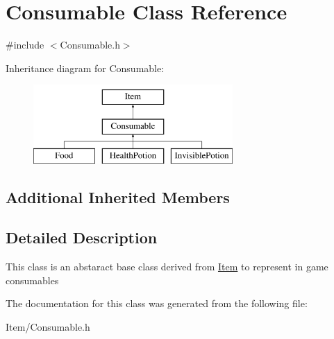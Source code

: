 \hypertarget{classConsumable}{\section{Consumable Class Reference}
\label{classConsumable}
}


{\ttfamily \#include $<$Consumable.\-h$>$}

Inheritance diagram for Consumable\-:\begin{figure}[H]
\begin{center}
\leavevmode
\includegraphics[height=3.000000cm]{classConsumable}
\end{center}
\end{figure}
\subsection*{Additional Inherited Members}


\subsection{Detailed Description}
This class is an abstaract base class derived from \hyperlink{classItem}{Item} to represent in game consumables 

The documentation for this class was generated from the following file\-:\begin{DoxyCompactItemize}
\item 
Item/Consumable.\-h\end{DoxyCompactItemize}
